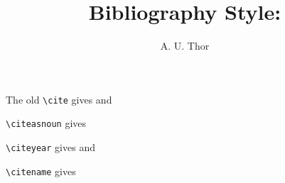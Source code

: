 \documentclass{article}
\author{A. U. Thor}
\date{}
\title{Bibliography Style: {\tt {\mode}}}
\def\mode{cje}
\begin{document}
  

  \maketitle

The old \verb|\cite| gives \cite{ww} and \cite{ww,waters}

\verb|\citeasnoun| gives 

\verb|\citeyear| gives \citeyear{ww} and \citeyear{ww,waters}

\verb|\citename| gives 

  \nocite{*}

  
\end{document}
